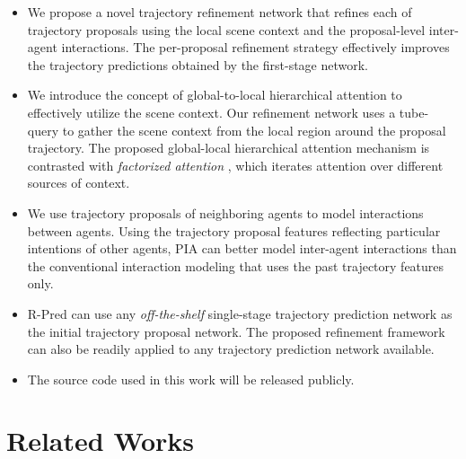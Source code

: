 \documentclass[10pt,twocolumn,letterpaper]{article}
\begin{document}
\begin{itemize}
\setlength\itemsep{0.1em}
    \item We propose a novel trajectory refinement network that refines each of   trajectory proposals using the local  scene context and  the proposal-level inter-agent interactions. The per-proposal refinement strategy effectively improves the trajectory predictions obtained by the first-stage network.  
    \item We introduce the concept of global-to-local hierarchical attention to effectively utilize the scene context. Our refinement network  uses a tube-query to gather the scene context from the local region around the proposal trajectory. 
The proposed global-local hierarchical attention mechanism is contrasted with {\it factorized attention} \cite{Scenetransformer, Wayformer}, which iterates attention over different sources of context.
    \item We use trajectory proposals of neighboring agents to model interactions between agents. 
Using the trajectory proposal features reflecting particular intentions of other agents, PIA can better model inter-agent interactions  than the conventional interaction modeling that uses the past trajectory features only.
    \item R-Pred can use any {\it off-the-shelf} single-stage  trajectory prediction network as the initial trajectory proposal network.  The proposed refinement framework can also be readily applied to any trajectory prediction network available. 
    \item The source code used in this work will be released publicly. 
\end{itemize}


\section{Related Works}
\label{sec:related work}
\end{document}
